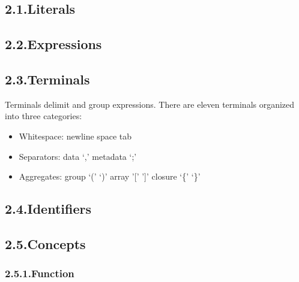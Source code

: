 \documentclass[preprint]{{sigplanconf}}
\begin{document}
\subsection{2.1.\hspace*{0.5em}Literals}\label{sec-literals}%

\subsection{2.2.\hspace*{0.5em}Expressions}\label{sec-expressions}%

\subsection{2.3.\hspace*{0.5em}Terminals}\label{sec-terminals}%

\noindent Terminals delimit and group expressions. There are eleven terminals
organized into three categories:%

\begin{itemize}[noitemsep,topsep=\mdcompacttopsep]%

\item Whitespace: newline \textbar{} space \textbar{} tab%

\item Separators:  data \textquoteleft{},\textquoteright{} \textbar{} metadata \textquoteleft{};\textquoteright{}%

\item Aggregates:  group \textquoteleft{}(\textquoteright{} \textquoteleft{})\textquoteright{} \textbar{} array '[' ']' \textbar{} closure \textquoteleft{}\{\textquoteright{} \textquoteleft{}\}\textquoteright{}%
\end{itemize}%

\subsection{2.4.\hspace*{0.5em}Identifiers}\label{sec-identifiers}%

\subsection{2.5.\hspace*{0.5em}Concepts}\label{sec-concepts}%

\subsubsection{2.5.1.\hspace*{0.5em}Function}\label{sec-function}%
\end{document}

